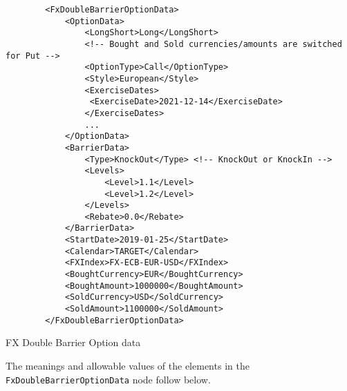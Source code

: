 \begin{listing}[H]
\begin{verbatim}
        <FxDoubleBarrierOptionData>
            <OptionData>
                <LongShort>Long</LongShort>
                <!-- Bought and Sold currencies/amounts are switched for Put -->
                <OptionType>Call</OptionType>
                <Style>European</Style>
                <ExerciseDates>
                 <ExerciseDate>2021-12-14</ExerciseDate>
                </ExerciseDates>                
                ...
            </OptionData>
            <BarrierData>
                <Type>KnockOut</Type> <!-- KnockOut or KnockIn -->
                <Levels>
                    <Level>1.1</Level>
                    <Level>1.2</Level>
                </Levels>
                <Rebate>0.0</Rebate>   
            </BarrierData>
            <StartDate>2019-01-25</StartDate>
            <Calendar>TARGET</Calendar>            
            <FXIndex>FX-ECB-EUR-USD</FXIndex>
            <BoughtCurrency>EUR</BoughtCurrency>
            <BoughtAmount>1000000</BoughtAmount>
            <SoldCurrency>USD</SoldCurrency>
            <SoldAmount>1100000</SoldAmount>
        </FxDoubleBarrierOptionData>
\end{verbatim}
\caption{FX Double Barrier Option data}
\label{lst:FxDoubleBarrieroption_data}
\end{listing}

The meanings and allowable values of the elements in the \lstinline!FxDoubleBarrierOptionData!  node follow below.

